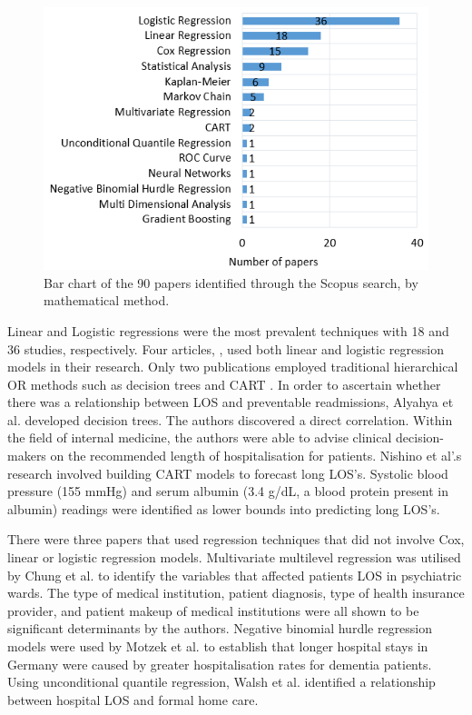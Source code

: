 \documentclass[../thesis.tex]{subfiles}
\begin{document}
\begin{figure}[h!]
    \centering
    \includegraphics[scale=1.2]{Chapters/Chapter2/Figures3/2lrMethod.png}
    \caption{Bar chart of the 90 papers identified through the Scopus search, by mathematical method.}
    \label{fig:lr2method}
\end{figure}

Linear and Logistic regressions were the most prevalent techniques with 18 and 36 studies, respectively. Four articles, \cite{Adamis2017,Lisk2018,Motohashi2013,Naouri2022}, used both linear and logistic regression models in their research. Only two publications employed traditional hierarchical OR methods such as decision trees and CART \cite{Alyahya2017,Nishino2019}. In order to ascertain whether there was a relationship between LOS and preventable readmissions, Alyahya et al. \cite{Alyahya2017} developed decision trees. The authors discovered a direct correlation. Within the field of internal medicine, the authors were able to advise clinical decision-makers on the recommended length of hospitalisation for patients. Nishino et al'.s \cite{Nishino2019} research involved building CART models to forecast long LOS's. Systolic blood pressure (155 mmHg) and serum albumin (3.4 g/dL, a blood protein present in albumin) readings were identified as lower bounds into predicting long LOS's. 

There were three papers that used regression techniques that did not involve Cox, linear or logistic regression models. Multivariate multilevel regression was utilised by Chung et al. \cite{Chung2010} to identify the variables that affected patients LOS in psychiatric wards. The type of medical institution, patient diagnosis, type of health insurance provider, and patient makeup of medical institutions were all shown to be significant determinants by the authors. Negative binomial hurdle regression models were used by Motzek et al. \cite{Motzek2018} to establish that longer hospital stays in Germany were caused by greater hospitalisation rates for dementia patients. Using unconditional quantile regression, Walsh et al. \cite{Walsh2020} identified a relationship between hospital LOS and formal home care.
\end{document}

